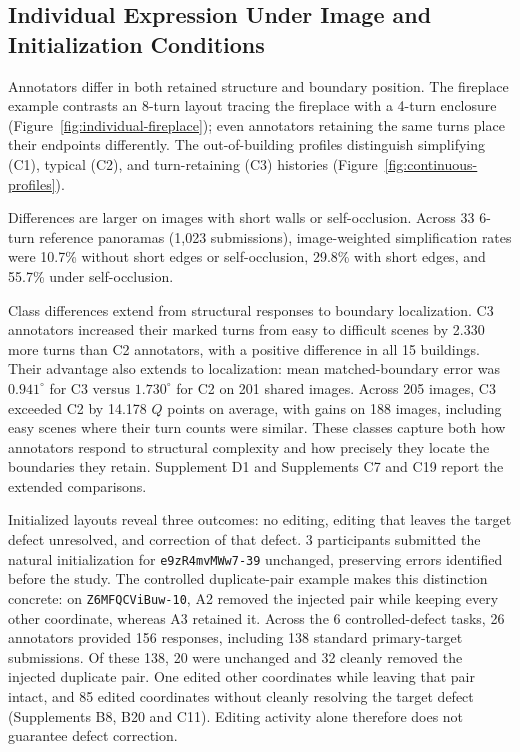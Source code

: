 \subsection{Individual Expression Under Image and Initialization Conditions}
\label{sec:individual}

Annotators differ in both retained structure and boundary position. The fireplace example contrasts an 8-turn layout tracing the fireplace with a 4-turn enclosure (Figure~\ref{fig:individual-fireplace}); even annotators retaining the same turns place their endpoints differently. The out-of-building profiles distinguish simplifying (C1), typical (C2), and turn-retaining (C3) histories (Figure~\ref{fig:continuous-profiles}).



Differences are larger on images with short walls or self-occlusion. Across 33 6-turn reference panoramas (1,023 submissions), image-weighted simplification rates were 10.7\% without short edges or self-occlusion, 29.8\% with short edges, and 55.7\% under self-occlusion.

Class differences extend from structural responses to boundary localization. C3 annotators increased their marked turns from easy to difficult scenes by 2.330 more turns than C2 annotators, with a positive difference in all 15 buildings. Their advantage also extends to localization: mean matched-boundary error was $0.941^\circ$ for C3 versus $1.730^\circ$ for C2 on 201 shared images. Across 205 images, C3 exceeded C2 by 14.178 $Q$ points on average, with gains on 188 images, including easy scenes where their turn counts were similar. These classes capture both how annotators respond to structural complexity and how precisely they locate the boundaries they retain. Supplement D1 and Supplements C7 and C19 report the extended comparisons.

Initialized layouts reveal three outcomes: no editing, editing that leaves the target defect unresolved, and correction of that defect. 3 participants submitted the natural initialization for \texttt{e9zR4mvMWw7-39} unchanged, preserving errors identified before the study. The controlled duplicate-pair example makes this distinction concrete: on \texttt{Z6MFQCViBuw-10}, A2 removed the injected pair while keeping every other coordinate, whereas A3 retained it. Across the 6 controlled-defect tasks, 26 annotators provided 156 responses, including 138 standard primary-target submissions. Of these 138, 20 were unchanged and 32 cleanly removed the injected duplicate pair. One edited other coordinates while leaving that pair intact, and 85 edited coordinates without cleanly resolving the target defect (Supplements B8, B20 and C11). Editing activity alone therefore does not guarantee defect correction.


